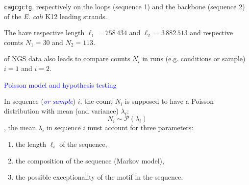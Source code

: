 \documentclass[dvips, lscape]{foils}
\newcommand{\Pcal}{\mathcal{P}}
\newcommand{\textblue}[1]{\textcolor{blue}{#1}}
\newcommand{\section}[1]{\centerline{\Large \textblue{#1}}}
\newcommand{\subsection}[1]{\noindent{\large \textblue{#1}}}
\newcommand{\emphase}[1]{{\textblue{\sl #1}}}
\newcommand{\paragraph}[1]{\noindent {\textblue{#1}}}
\begin{document}
\paragraph{8-letter palindrome.}
{\tt cagcgctg}, respectively on the loops (sequence 1) and the
backbone (sequence 2) of the \textit{E.  coli} K12 leading strands.

The have respective length $\ell_1 = 758\,434$ and $\ell_2 =
3\,882\,513$ and respective counts $N_1 = 30$ and $N_2 = 113$.

\bigskip\bigskip
\subsection{Extension to CBME}

\paragraph{Differential analysis} of NGS data also
leads to compare counts $N_i$ in runs (e.g. conditions or sample)
$i=1$ and $i=2$.

\newpage
\section{Poisson model and hypothesis testing}

\subsection{Poisson model} \label{Sec:PoissonModel}

In sequence (\emphase{or sample}) $i$, the count $N_i$ is supposed to
have a Poisson distribution with mean (and variance) $\lambda_i$:
$$
N_i \sim \Pcal(\lambda_i)
$$
\paragraph{For motif count in sequences}, the mean $\lambda_i$ in
sequence $i$ must account for three parameters: 
\begin{enumerate}[($i$)]
\item the length $\ell_i$ of the sequence, 
\item the composition of the sequence (Markov model), 
\item the possible exceptionality of the motif in the sequence.
\end{enumerate}
\end{document}
